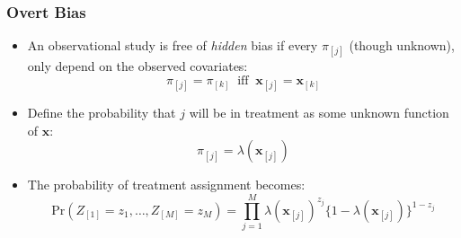 \documentclass{beamer}
\begin{document}
\begin{frame}
  \frametitle{Overt Bias}
  \begin{itemize}
  \item<+-> An observational study is free of \textit{hidden} bias if every
    $\pi_{[j]}$ (though unknown), only depend on the observed
    covariates: 
$$\pi_{[j]}=\pi_{[k]}\ \text{  iff  }\ \mathbf{x}_{[j]}=\mathbf{x}_{[k]}$$

\item<+-> Define the probability that $j$ will be in treatment as some unknown
  function of $\mathbf{x}$:  $$\pi_{[j]}=\lambda(\mathbf{x}_{[j]})$$

\item<+-> The
  probability of treatment assignment becomes:
\[
\textrm{Pr}(Z_{[1]}=z_1,\dots, Z_{[M]} =z_M) = \prod_{j=1}^M \lambda(\mathbf{x}_{[j]})^{z_{j}}\{1-\lambda(\mathbf{x}_{[j]})\}^{1-z_j}
\]
  \end{itemize}
\end{frame}

\end{document}
